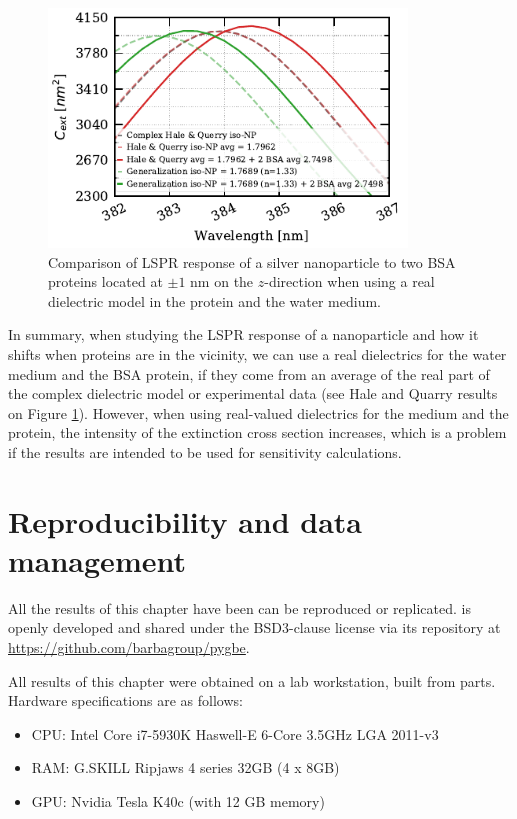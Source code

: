  \begin{figure} %
    \centering
    \includegraphics[width=0.85\textwidth]{bsa_phan_avg_real_water_diel.pdf} 
    \caption{Comparison of LSPR response of a silver nanoparticle to two BSA proteins located at $\pm1$ nm on the $z$-direction
    when using a real dielectric model in the protein and the water medium.}
    \label{fig:bsa_w_real}
 \end{figure}

In summary, when studying the LSPR response of a nanoparticle and how it shifts when proteins are in the vicinity, we can use 
a real dielectrics for the water medium and the BSA protein, if they come from an average of the real part of the complex dielectric model 
or experimental data (see Hale and Quarry results on Figure \ref{fig:bsa_w_real}). However, when using real-valued dielectrics for the medium 
and the protein, the intensity of the extinction cross section increases, which is a problem if the results are intended to be used for 
sensitivity calculations. 



\section{Reproducibility and data management} \label{sec:repro_ell}
 
All the results of this chapter have been can be reproduced or replicated. \pygbe is openly developed and 
shared under the BSD3-clause license via its repository at \url{https://github.com/barbagroup/pygbe}.

All results of this chapter were obtained on a lab workstation, built from parts. Hardware specifications are as follows:

\begin{itemize}
  \item CPU: Intel Core i7-5930K Haswell-E 6-Core 3.5GHz LGA 2011-v3
  \item RAM: G.SKILL Ripjaws 4 series 32GB (4 x 8GB)
  \item GPU: Nvidia Tesla K40c (with 12 GB memory)
\end{itemize}

